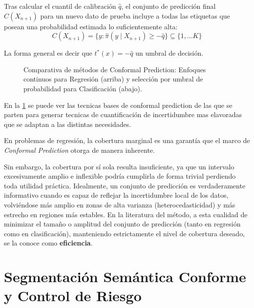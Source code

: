\begin{itemize}
    Tras calcular el cuantil de calibración $\hat{q}$, el conjunto de predicción final $C(X_{n+1})$ para un nuevo dato de prueba incluye a todas las etiquetas que posean una probabilidad estimada lo suficientemente alta:
    $$C(X_{n+1}) = \{y : \hat{\pi}(y \mid X_{n+1}) \ge -\hat{q}\} \subseteq \{ 1, \dots K \} $$

    La forma general es decir que $t^*(x) = -\hat{q}$ un umbral de decisión.


\end{itemize}


\begin{figure}[H]
    \centering
    \resizebox{1.0\textwidth}{!}{}
    \caption{Comparativa de métodos de Conformal Prediction: Enfoques continuos para Regresión (arriba) y selección por umbral de probabilidad para Clasificación (abajo).}
    \label{fig:conformal_full_panel}
\end{figure}


En la \ref{fig:conformal_full_panel} se puede ver las tecnicas bases de conformal prediction de las que se parten para generar tecnicas de cuantificación de incertidumbre mas elavoradas que se adaptan a las distintas necesidades.


En problemas de regresión, la cobertura marginal es una garantía que el marco de \textit{Conformal Prediction} otorga de manera inherente.

Sin embargo, la cobertura por sí sola resulta insuficiente, ya que un intervalo excesivamente amplio e inflexible podría cumplirla de forma trivial perdiendo toda utilidad práctica. Idealmente, un conjunto de predicción es verdaderamente informativo cuando es capaz de reflejar la incertidumbre local de los datos, volviéndose más amplio en zonas de alta varianza (heterocedasticidad) y más estrecho en regiones más estables.
En la literatura del método, a esta cualidad de minimizar el tamaño o amplitud del conjunto de predicción (tanto en regresión como en clasificación), manteniendo estrictamente el nivel de cobertura deseado, se la conoce como \textbf{eficiencia}.


\section{Segmentación Semántica Conforme y Control de Riesgo}

